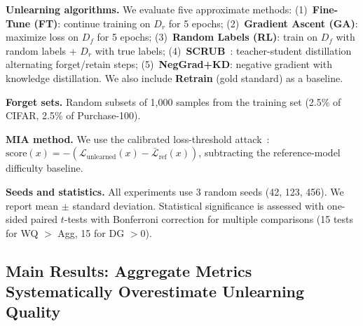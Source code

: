 \documentclass{article}
\begin{document}
\textbf{Unlearning algorithms.}
We evaluate five approximate methods:
(1)~\textbf{Fine-Tune (FT)}: continue training on $D_r$ for 5 epochs;
(2)~\textbf{Gradient Ascent (GA)}: maximize loss on $D_f$ for 5 epochs;
(3)~\textbf{Random Labels (RL)}: train on $D_f$ with random labels + $D_r$ with true labels;
(4)~\textbf{SCRUB}~\citep{kurmanji2023towards}: teacher-student distillation alternating forget/retain steps;
(5)~\textbf{NegGrad+KD}: negative gradient with knowledge distillation.
We also include \textbf{Retrain} (gold standard) as a baseline.

\textbf{Forget sets.}
Random subsets of 1,000 samples from the training set (2.5\% of CIFAR, 2.5\% of Purchase-100).

\textbf{MIA method.}
We use the calibrated loss-threshold attack~\citep{watson2022importance}: $\text{score}(x) = -(\mathcal{L}_{\text{unlearned}}(x) - \bar{\mathcal{L}}_{\text{ref}}(x))$, subtracting the reference-model difficulty baseline.

\textbf{Seeds and statistics.}
All experiments use 3 random seeds (42, 123, 456). We report mean $\pm$ standard deviation. Statistical significance is assessed with one-sided paired $t$-tests with Bonferroni correction for multiple comparisons (15 tests for WQ $>$ Agg, 15 for DG $> 0$).

\subsection{Main Results: Aggregate Metrics Systematically Overestimate Unlearning Quality}
\end{document}
